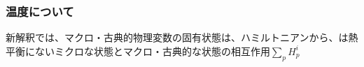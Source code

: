 \subsubsection{温度について}
新解釈では、マクロ・古典的物理変数の固有状態は、ハミルトニアンから、は熱平衡にないミクロな状態とマクロ・古典的な状態の相互作用$\sum_p H_p^i$